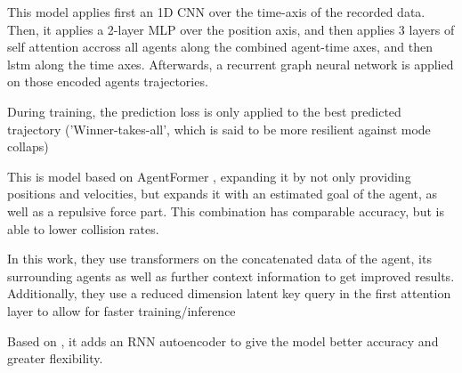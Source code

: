 \cite{cheng2023gatraj} This model applies first an 1D CNN over the time-axis of the recorded data. Then, it applies a 2-layer MLP over the position axis, and then applies 3 layers of self attention accross all agents along the combined agent-time axes, and then lstm along the time axes. Afterwards, a recurrent graph neural network is applied on those encoded agents trajectories. 

During training, the prediction loss is only applied to the best predicted trajectory ('Winner-takes-all', which is said to be more resilient against mode collaps)


\cite{narayanan2023ewarenet}


\cite{zhang2023forceformer} This is model based on AgentFormer \cite{yuan2021agentformer}, expanding it by not only providing positions and velocities, but expands it with an estimated goal of the agent, as well as a repulsive force part. This combination has comparable accuracy, but is able to lower collision rates.


\cite{nayakanti2023wayformer} In this work, they use transformers on the concatenated data of the agent, its surrounding agents as well as further context information to get improved results. Additionally, they use a reduced dimension latent key query in the first attention layer to allow for faster training/inference


\cite{aydemir2023adapt}


\cite{shi2023trajectory}


\cite{meszaros2024trajflow} Based on \cite{scholler2021flomo}, it adds an RNN autoencoder to give the model better accuracy and greater flexibility.


